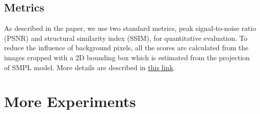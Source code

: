 \subsection{Metrics}
As described in the paper, we use two standard metrics, peak signal-to-noise ratio (PSNR) and structural similarity index (SSIM), for quantitative evaluation. To reduce the influence of background pixels, all the scores are calculated from the images cropped with a 2D bounding box which is estimated from the projection of SMPL model. More details are described in \href{https://github.com/zju3dv/neuralbody/blob/master/supplementary_material.md}{this link}. 







\section{More Experiments}
\label{sec:more_exp}

